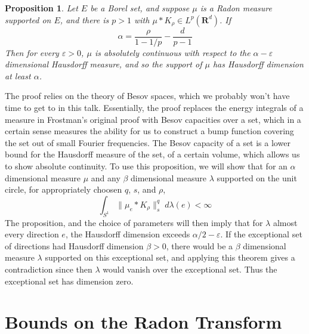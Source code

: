 \documentclass{article}
\theoremstyle{plain}
\newtheorem{prop}[theorem]{Proposition}
\theoremstyle{remark}
\theoremstyle{definition}
\begin{document}
\begin{prop}
	Let $E$ be a Borel set, and suppose $\mu$ is a Radon measure supported on $E$, and there is $p > 1$ with $\mu * K_\rho \in L^p(\mathbf{R}^d)$. If
	\[ \alpha = \frac{\rho}{1 - 1/p} - \frac{d}{p-1} \]
	Then for every $\varepsilon > 0$, $\mu$ is absolutely continuous with respect to the $\alpha - \varepsilon$ dimensional Hausdorff measure, and so the support of $\mu$ has Hausdorff dimension at least $\alpha$.
\end{prop}

The proof relies on the theory of Besov spaces, which we probably won't have time to get to in this talk. Essentially, the proof replaces the energy integrals of a measure in Frostman's original proof with Besov capacities over a set, which in a certain sense measures the ability for us to construct a bump function covering the set out of small Fourier frequencies. The Besov capacity of a set is a lower bound for the Hausdorff measure of the set, of a certain volume, which allows us to show absolute continuity. To use this proposition, we will show that for an $\alpha$ dimensional measure $\mu$ and any $\beta$ dimensional measure $\lambda$ supported on the unit circle, for appropriately choosen $q$, $s$, and $\rho$,
%
\[ \int_{S^1} \| \mu_e * K_\rho \|_s^q\; d\lambda(e) < \infty \]
%
The proposition, and the choice of parameters will then imply that for $\lambda$ almost every direction $e$, the Hausdorff dimension exceeds $\alpha/2 - \varepsilon$. If the exceptional set of directions had Hausdorff dimension $\beta > 0$, there would be a $\beta$ dimensional measure $\lambda$ supported on this exceptional set, and applying this theorem gives a contradiction since then $\lambda$ would vanish over the exceptional set. Thus the exceptional set has dimension zero.

\section{Bounds on the Radon Transform}
\end{document}
